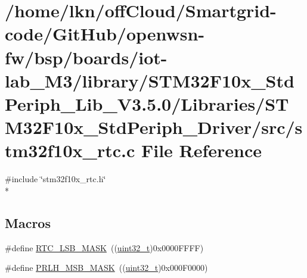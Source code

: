 \hypertarget{iot-lab___m3_2library_2_s_t_m32_f10x___std_periph___lib___v3_85_80_2_libraries_2_s_t_m32_f10x___d1370fdc3a34d2660f4389a493e014ba}{}\section{/home/lkn/off\+Cloud/\+Smartgrid-\/code/\+Git\+Hub/openwsn-\/fw/bsp/boards/iot-\/lab\+\_\+\+M3/library/\+S\+T\+M32\+F10x\+\_\+\+Std\+Periph\+\_\+\+Lib\+\_\+\+V3.5.0/\+Libraries/\+S\+T\+M32\+F10x\+\_\+\+Std\+Periph\+\_\+\+Driver/src/stm32f10x\+\_\+rtc.c File Reference}
\label{iot-lab___m3_2library_2_s_t_m32_f10x___std_periph___lib___v3_85_80_2_libraries_2_s_t_m32_f10x___d1370fdc3a34d2660f4389a493e014ba}
{\ttfamily \#include \char`\"{}stm32f10x\+\_\+rtc.\+h\char`\"{}}\\*
\subsection*{Macros}
\begin{DoxyCompactItemize}
\item 
\#define \hyperlink{group___r_t_c___private___defines_gae19d75bb0ecb5e93d97e026a04d4854f}{R\+T\+C\+\_\+\+L\+S\+B\+\_\+\+M\+A\+SK}~((\hyperlink{_p_e___types_8h_a33594304e786b158f3fb30289278f5af}{uint32\+\_\+t})0x0000\+F\+F\+F\+F)
\item 
\#define \hyperlink{group___r_t_c___private___defines_ga47b3eed8e018a9139bc7bb374c7ca125}{P\+R\+L\+H\+\_\+\+M\+S\+B\+\_\+\+M\+A\+SK}~((\hyperlink{_p_e___types_8h_a33594304e786b158f3fb30289278f5af}{uint32\+\_\+t})0x000\+F0000)
\end{DoxyCompactItemize}
